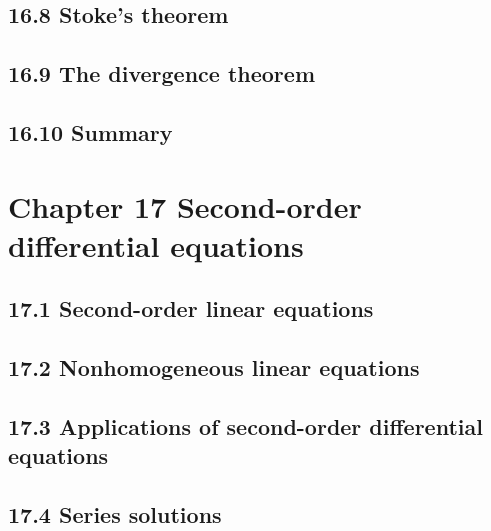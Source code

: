 \documentclass{article}
\begin{document}
\subsection{16.8 Stoke's theorem}
\subsection{16.9 The divergence theorem}
\subsection{16.10 Summary}

\section{Chapter 17 Second-order differential equations}
\subsection{17.1 Second-order linear equations}
\subsection{17.2 Nonhomogeneous linear equations}
\subsection{17.3 Applications of second-order differential equations}
\subsection{17.4 Series solutions}
\end{document}
